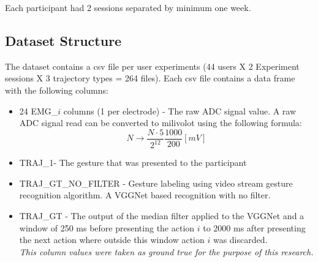 Each participant had 2 sessions separated by minimum one week.

\subsection{Dataset Structure}
The dataset contains a csv file per user experiments (44 users X 2 Experiment sessions X 3 trajectory types = 264 files).
Each csv file contains a data frame with the following columns:
\begin{itemize}
    \item 24 EMG\_$i$ columns (1 per electrode) - The raw ADC signal value. A raw ADC signal read can be converted to milivolot using the following formula:
    $$N \rightarrow \frac{N \cdot 5}{2^{12}}\frac{1000}{200}[mV]$$
    \item TRAJ\_1- The gesture that was presented to the participant
    \item TRAJ\_GT\_NO\_FILTER - Gesture labeling using video stream gesture recognition algorithm. A VGGNet based recognition with no filter.
    \item TRAJ\_GT - The output of the median filter applied to the VGGNet and a window of 250 ms before presenting the action $i$ to 2000 ms after presenting the next action where outside this window action $i$ was discarded. \\ \textit{This column values were taken as ground true for the purpose of this research.}
    
\end{itemize}

